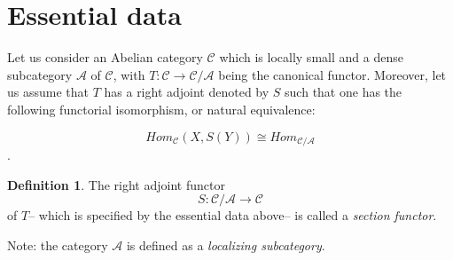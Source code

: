\documentclass[12pt]{article}
\theoremstyle{plain}
\theoremstyle{definition}
\newtheorem{definition}{Definition}[section]
\numberwithin{equation}{section}
\begin{document}
\section{Essential data}
Let us consider an Abelian category $\mathcal{C}$ which is locally small and
a dense subcategory  $\mathcal{A}$ of $\mathcal{C}$, with 
$T: \mathcal{C} \to  \mathcal{C}/\mathcal{A}$ being the canonical functor.
Moreover, let us assume that $T$ has a right adjoint denoted by $S$ such that one has the
following functorial isomorphism, or natural equivalence:

$$Hom_{\mathcal{C}}(X, S(Y)) \cong Hom_{\mathcal{C} / \mathcal{A}}$$.


\begin{definition}
The right adjoint functor $$S: \mathcal{C}/ \mathcal{A} \to \mathcal{C}$$ of $T$--
which is specified by the essential data above-- is called a \emph{section functor}.

\end{definition}

Note: the category $\mathcal{A}$ is defined as a \emph{localizing subcategory}.

\end{document}
